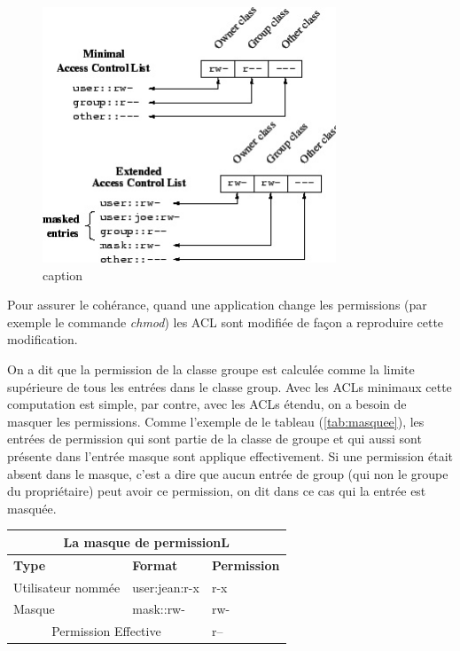\begin{figure}[htbp]
\centering
\includegraphics[height=3in]{img/acl-mapping.jpg}
\caption{caption}
\label{fig:img_acl-mapping}
\end{figure}
 
 
Pour assurer le cohérance, quand une application change les permissions (par exemple le commande \emph{chmod}) les ACL sont modifiée de façon a reproduire cette modification.
 
On a dit que la permission de la classe groupe est calculée comme la limite supérieure de tous les entrées dans le classe group. Avec les ACLs minimaux cette computation est simple, par contre, avec les ACLs étendu, on a besoin de masquer les permissions. Comme l'exemple de le tableau (\ref{tab:masquee}), les entrées de permission qui sont partie de la classe de groupe et qui aussi sont présente dans l'entrée masque sont applique effectivement. Si une permission était absent dans le masque, c'est a dire que aucun entrée de group (qui non le groupe du propriétaire) peut avoir ce permission, on dit dans ce cas qui la entrée est masquée.
 
\begin{center}
\begin{tabular}{|l|l|l|}
  \hline
    \multicolumn{3}{|c|}{La masque de permissionL} \\
  \hline
\textbf{Type} & \textbf{Format} & \textbf{Permission} \\
  \hline
Utilisateur nommée & user:jean:r-x & r-x\\
  \hline
Masque & mask::rw- & rw-\\
  \hline
\multicolumn{2}{|c|}{Permission Effective} & r--\\
  \hline
\end{tabular}
\label{tab:masque}
\end{center}
 

